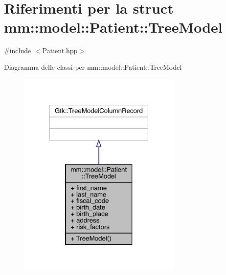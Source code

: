 \hypertarget{structmm_1_1model_1_1_patient_1_1_tree_model}{}\section{Riferimenti per la struct mm\+:\+:model\+:\+:Patient\+:\+:Tree\+Model}
\label{structmm_1_1model_1_1_patient_1_1_tree_model}


{\ttfamily \#include $<$Patient.\+hpp$>$}



Diagramma delle classi per mm\+:\+:model\+:\+:Patient\+:\+:Tree\+Model\nopagebreak
\begin{figure}[H]
\begin{center}
\leavevmode
\includegraphics[width=231pt]{db/d2c/structmm_1_1model_1_1_patient_1_1_tree_model__inherit__graph}
\end{center}
\end{figure}


